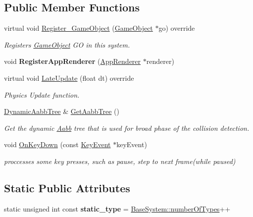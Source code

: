 \subsection*{Public Member Functions}
\begin{DoxyCompactItemize}
\item 
virtual void \hyperlink{classRigidbodySystem_adcb7612aeca5d51fa8d886cfd15de991}{Register\+\_\+\+Game\+Object} (\hyperlink{classGameObject}{Game\+Object} $\ast$go) override
\begin{DoxyCompactList}\small\item\em Registers \hyperlink{classGameObject}{Game\+Object} GO in this system. \end{DoxyCompactList}\item 
\mbox{\label{classRigidbodySystem_a5235d7d991327cac42986523c5d44580}} 
void {\bfseries Register\+App\+Renderer} (\hyperlink{classAppRenderer}{App\+Renderer} $\ast$renderer)
\item 
virtual void \hyperlink{classRigidbodySystem_a3ae11c7e5a8572247fb2e01729e32af9}{Late\+Update} (float dt) override
\begin{DoxyCompactList}\small\item\em Physics Update function. \end{DoxyCompactList}\item 
\hyperlink{classDynamicAabbTree}{Dynamic\+Aabb\+Tree} \& \hyperlink{classRigidbodySystem_aadf0ff84d1e6469ca8d6281aa0f9af70}{Get\+Aabb\+Tree} ()
\begin{DoxyCompactList}\small\item\em Get the dynamic \hyperlink{classAabb}{Aabb} tree that is used for broad phase of the collision detection. \end{DoxyCompactList}\item 
void \hyperlink{classRigidbodySystem_adf706ab9fd20dde6f148514d76bfa982}{On\+Key\+Down} (const \hyperlink{classKeyEvent}{Key\+Event} $\ast$key\+Event)
\begin{DoxyCompactList}\small\item\em proccesses some key presses, such as pause, step to next frame(while paused) \end{DoxyCompactList}\end{DoxyCompactItemize}
\subsection*{Static Public Attributes}
\begin{DoxyCompactItemize}
\item 
\mbox{\label{classRigidbodySystem_a4149fa1ec0b595ce1e4d3f45ed7da797}} 
static unsigned int const {\bfseries static\+\_\+type} = \hyperlink{classBaseSystem_a7ef356edab3cfb02905e0a73a645b131}{Base\+System\+::number\+Of\+Types}++
\end{DoxyCompactItemize}
